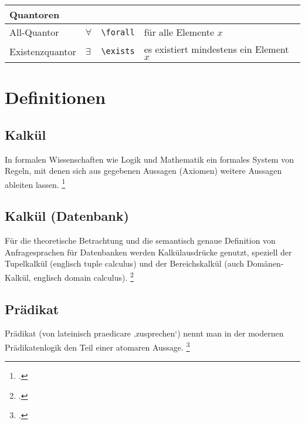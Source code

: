 \documentclass{lehramt-informatik-haupt}
\begin{document}
\begin{tabular}{l|l|l|l}
\hline

\multicolumn{4}{l}{Quantoren} \\

\hline
\hline

All-Quantor & $\forall$ & \verb|\forall| & für alle Elemente $x$ \\

Existenzquantor & $\exists$ & \verb|\exists| & es existiert mindestens ein Element $x$\\

\end{tabular}

%

\section{Definitionen}

%

\subsection{Kalkül}

In formalen Wissenschaften wie Logik und Mathematik ein formales System
von Regeln, mit denen sich aus gegebenen Aussagen (Axiomen) weitere
Aussagen ableiten lassen.
\footcite{wiki:kalkuel}

%

\subsection{Kalkül (Datenbank)}

Für die theoretische Betrachtung und die semantisch genaue Definition
von Anfragesprachen für Datenbanken werden Kalkülausdrücke genutzt,
speziell der Tupelkalkül (englisch tuple calculus) und der
Bereichskalkül (auch Domänen-Kalkül, englisch domain calculus).
\footcite{wiki:kalkuel-datenbank}

%

\subsection{Prädikat}

Prädikat (von lateinisch praedicare ‚zusprechen‘) nennt man in der
modernen Prädikatenlogik den Teil einer atomaren Aussage.
\footcite{wiki:praedikat-logik}
\end{document}
